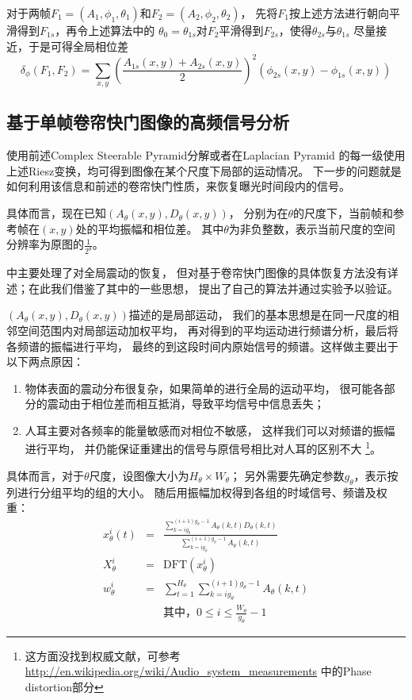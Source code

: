 对于两帧$F_1 = (A_1, \phi_1, \theta_1)$和$F_2 = (A_2, \phi_2, \theta_2)$，
先将$F_1$按上述方法进行朝向平滑得到$F_{1s}$，再令上述算法中的
$\theta_0=\theta_{1s}$对$F_2$平滑得到$F_{2s}$，使得$\theta_{2s}$与$\theta_{1s}$
尽量接近，于是可得全局相位差
\begin{equation}
    \delta_\phi(F_1, F_2) = \sum_{x, y}
    \left(\frac{A_{1s}(x, y) + A_{2s}(x, y)}{2}\right)^2(\phi_{2s}(x, y) -
    \phi_{1s}(x, y))
\end{equation}


\subsection{基于单帧卷帘快门图像的高频信号分析\label{sec:algo-hf}}
使用前述Complex Steerable Pyramid分解或者在Laplacian Pyramid
的每一级使用上述Riesz变换，均可得到图像在某个尺度下局部的运动情况。
下一步的问题就是如何利用该信息和前述的卷帘快门性质，来恢复曝光时间段内的信号。

具体而言，现在已知$(A_\theta(x, y), D_\theta(x, y))$，
分别为在$\theta$的尺度下，当前帧和参考帧在$(x, y)$处的平均振幅和相位差。
其中$\theta$为非负整数，表示当前尺度的空间分辨率为原图的$\frac{1}{2^\theta}$。

\cite{Davis2014VisualMic}中主要处理了对全局震动的恢复，
但对基于卷帘快门图像的具体恢复方法没有详述；在此我们借鉴了其中的一些思想，
提出了自己的算法并通过实验予以验证。

$(A_\theta(x, y), D_\theta(x, y))$描述的是局部运动，
我们的基本思想是在同一尺度的相邻空间范围内对局部运动加权平均，
再对得到的平均运动进行频谱分析，最后将各频谱的振幅进行平均，
最终的到这段时间内原始信号的频谱。这样做主要出于以下两点原因：
\begin{enumerate}
    \item 物体表面的震动分布很复杂，如果简单的进行全局的运动平均，
        很可能各部分的震动由于相位差而相互抵消，导致平均信号中信息丢失；
    \item 人耳主要对各频率的能量敏感而对相位不敏感，
        这样我们可以对频谱的振幅进行平均，
        并仍能保证重建出的信号与原信号相比对人耳的区别不大
        \footnote{这方面没找到权威文献，可参考
            \url{http://en.wikipedia.org/wiki/Audio\_system\_measurements}
        中的Phase distortion部分}。
\end{enumerate}

具体而言，对于$\theta$尺度，设图像大小为$H_\theta \times W_\theta$；
另外需要先确定参数$g_\theta$，表示按列进行分组平均的组的大小。
随后用振幅加权得到各组的时域信号、频谱及权重：
\begin{eqnarray}
    x_\theta^i(t) &=& \frac{\sum_{k=ig_\theta}^{(i+1)g_\theta-1}
    A_\theta(k, t)D_\theta(k, t)}
        {\sum_{k=ig_\theta}^{(i+1)g_\theta-1}A_\theta(k, t)} \\
    X_\theta^i &=& \text{DFT}(x_\theta^i) \\
    w_\theta^i &=& \sum_{t=1}^{H_\theta}
        {\sum_{k=ig_\theta}^{(i+1)g_\theta-1}A_\theta(k, t)} \\
    && \text{其中，} 0 \le i \le \frac{W_\theta}{g_\theta} - 1 \nonumber
\end{eqnarray}

